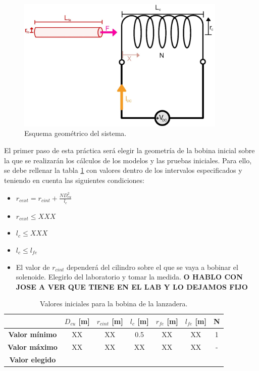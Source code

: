 \begin{figure}[H]
    \centering 
    \includegraphics[width=10cm]{FigurasMemoria/esquemaDesTeor.jpg}
    \caption{Esquema geométrico del sistema.}
    \label{fig:esquemaGeomPractica} %
\end{figure}

El primer paso de esta práctica será elegir la geometría de la bobina inicial sobre la que se realizarán los cálculos de los modelos y las pruebas iniciales. Para ello, se debe rellenar la tabla \ref{tab:bobIniPractica} con valores dentro de los intervalos especificados y teniendo en cuenta las siguientes condiciones:

\begin{itemize}
    \item \(r_{cext} = r_{cint} + \frac{ND_{cu}^2}{l_c}\)
    \item \(r_{cext} \leq XXX\)
    \item \(l_c \leq XXX\)
    \item \(l_c \leq l_{fe}\)
    \item El valor de \(r_{cint}\) dependerá del cilindro sobre el que se vaya a bobinar el solenoide. Elegirlo del laboratorio y tomar la medida. \textbf{O HABLO CON JOSE A VER QUE TIENE EN EL LAB Y LO DEJAMOS FIJO}
\end{itemize}

\begin{table}[H]
    \centering
    \setlength{\tabcolsep}{5pt}
    \renewcommand{\arraystretch}{1.2}
    \begin{tabular}{|c|c|c|c|c|c|c|}
        \hline
        \hbox{} & \textbf{\(D_{cu}\) [m]} & \textbf{\(r_{cint}\) [m]} & \textbf{\(l_c\) [m]} & \textbf{\(r_{fe}\) [m]} & \textbf{\(l_{fe}\) [m]} & \textbf{N} \\
        \hline
        \textbf{Valor mínimo} & XX & XX & 0.5 & XX & XX & 1 \\
        \textbf{Valor máximo} & XX & XX & XX & XX & XX & - \\
        \hline
        \textbf{Valor elegido} &  &  &  &  &  &  \\
        \hline
    \end{tabular}
    \caption{Valores iniciales para la bobina de la lanzadera.}
    \label{tab:bobIniPractica}
\end{table}


